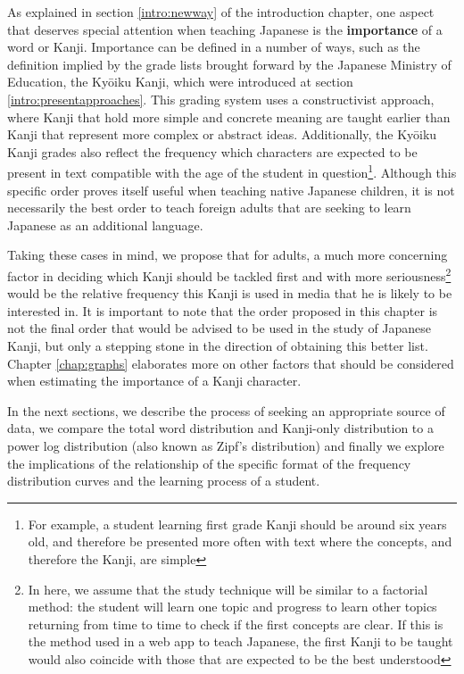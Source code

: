 As explained in section \ref{intro:newway} of the introduction chapter, one aspect that deserves special attention when teaching Japanese is the \textbf{importance} of a word or Kanji. Importance can be defined in a number of ways, such as the definition implied by the grade lists brought forward by the Japanese Ministry of Education, the Ky\={o}iku Kanji, which were introduced at section \ref{intro:presentapproaches}. This grading system uses a constructivist approach, where Kanji that hold more simple and concrete meaning are taught earlier than Kanji that represent more complex or abstract ideas. Additionally, the Ky\={o}iku Kanji grades also reflect the frequency which characters are expected to be present in text compatible with the age of the student in question\footnote{For example, a student learning first grade Kanji should be around six years old, and therefore be presented more often with text where the concepts, and therefore the Kanji, are simple}.
Although this specific order proves itself useful when teaching native Japanese children, it is not necessarily the best order to teach foreign adults that are seeking to learn Japanese as an additional language.

Taking these cases in mind, we propose that for adults, a much more concerning factor in deciding which Kanji should be tackled first and with more seriousness\footnote{In here, we assume that the study technique will be similar to a factorial method: the student will learn one topic and progress to learn other topics returning from time to time to check if the first concepts are clear. If this is the method used in a web app to teach Japanese, the first Kanji to be taught would also coincide with those that are expected to be the best understood} would be the relative frequency this Kanji is used in media that he is likely to be interested in. It is important to note that the order proposed in this chapter is not the final order that would be advised to be used in the study of Japanese Kanji, but only a stepping stone in the direction of obtaining this better list. Chapter \ref{chap:graphs} elaborates more on other factors that should be considered when estimating the importance of a Kanji character.

In the next sections, we describe the process of seeking an appropriate source of data, we compare the total word distribution and Kanji-only distribution to a power log distribution (also known as Zipf's distribution) and finally we explore the implications of the relationship of the specific format of the frequency distribution curves and the learning process of a student.

